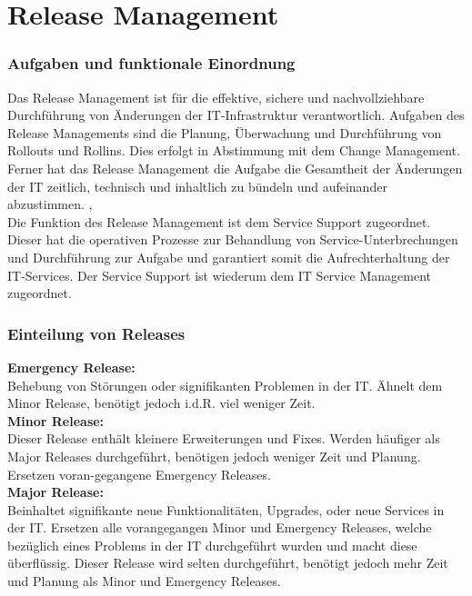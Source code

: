 \chapter{Release Management}
\subsection{Aufgaben und funktionale Einordnung}
Das Release Management ist für die effektive, sichere und nachvollziehbare Durchführung von Änderungen der IT-Infrastruktur verantwortlich. Aufgaben des Release Managements sind die Planung, Überwachung und Durchführung von Rollouts und Rollins. Dies erfolgt in Abstimmung mit dem Change Management.  Ferner hat das Release Management die Aufgabe die Gesamtheit der Änderungen der IT zeitlich, technisch und inhaltlich zu bündeln und aufeinander abzustimmen. \cite{wiki-it}, \cite{rm-pilorget}
\\
Die Funktion des Release Management ist dem Service Support zugeordnet. Dieser hat die operativen Prozesse zur Behandlung von Service-Unterbrechungen und Durchführung zur Aufgabe und garantiert somit die Aufrechterhaltung der IT-Services. Der Service Support ist wiederum dem IT Service Management zugeordnet.  \cite{wiki-it-service}

\subsection{Einteilung von Releases}
\textbf{Emergency Release:}
\\
Behebung von Störungen oder signifikanten Problemen in der IT. Ähnelt dem Minor Release, benötigt jedoch \acs{i.d.R.} viel weniger Zeit.
\\
\textbf{Minor Release:}
\\
Dieser Release enthält kleinere Erweiterungen und Fixes. Werden häufiger als Major Releases durchgeführt, benötigen jedoch weniger Zeit und Planung. Ersetzen voran-gegangene Emergency Releases. 
\\
\textbf{Major Release:}
\\
Beinhaltet signifikante neue Funktionalitäten, Upgrades, oder neue Services in der IT. Ersetzen alle vorangegangen Minor und Emergency Releases, welche bezüglich eines Problems in der IT durchgeführt wurden und macht diese überflüssig. Dieser Release wird selten durchgeführt, benötigt jedoch mehr Zeit und Planung als Minor und Emergency Releases.
\cite{rm-howard}
